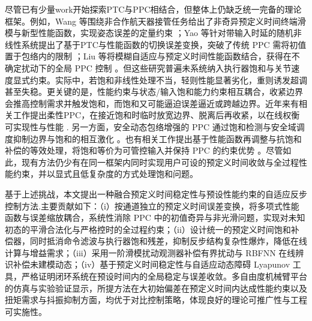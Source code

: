 \documentclass[pdflatex,sn-mathphys-num]{sn-jnl}%
\theoremstyle{thmstyleone}%
\theoremstyle{thmstyletwo}%
\theoremstyle{thmstylethree}%
\begin{document}
尽管已有少量work开始探索PTC与PPC相结合，但整体上仍缺乏统一完备的理论框架。例如，Wang 等围绕非合作航天器接管任务给出了非奇异预定义时间终端滑模与新型性能函数，实现姿态误差的定量约束 \cite{WangEtAl_2023_Predefinedtimeguaranteed}；Yao 等针对带输入时延的随机非线性系统提出了基于PTC与性能函数的切换误差变换，突破了传统 PPC 需将初值置于包络内的限制 \cite{YaoEtAl_2024_Prescribedtimeprescribed}；Liu 等将模糊自适应与预定义时间性能函数结合，获得在不确定扰动下的全局 PPC 控制 \cite{LiuEtAl_2025_Fuzzyadaptive}。但这些研究普遍未系统纳入执行器饱和与关节速度显式约束。实际中，若饱和非线性处理不当，轻则性能显著劣化，重则诱发超调甚至失稳。更关键的是，性能约束与状态/输入饱和能力约束相互耦合，收紧边界会推高控制需求并触发饱和，而饱和又可能逼迫误差逼近或跨越边界。近年来有相关工作提出柔性PPC，在接近饱和时临时放宽边界、脱离后再收紧，以在线权衡可实现性与性能 \cite{Bu_2023_Hypersonic,Yao_2024_Flexible}. 另一方面，安全动态包络增强的 PPC 通过饱和检测与安全域调度抑制边界与饱和的相互激化 \cite{Wang_2025_Enhanced}。也有相关工作提出基于性能函数再调整与抗饱和补偿的等效处理，将饱和等价为可管控输入并保持 PPC 的约束优势 \cite{Wang_2023_Adaptive,ElikerJouffroy_2025_robustquadrotor}。尽管如此，现有方法仍少有在同一框架内同时实现用户可设的预定义时间收敛与全过程性能约束，并以显式且低复杂度的方式处理饱和问题。

基于上述挑战，本文提出一种融合预定义时间稳定性与预设性能约束的自适应反步控制方法.主要贡献如下：（i）按通道独立的预定义时间误差变换，将多项式性能函数与误差缩放耦合，系统性消除 PPC 中的初值奇异与非光滑问题，实现对未知初态的平滑合法化与严格控时的全过程约束；（ii）设计统一的预定义时间饱和补偿器，同时抵消命令滤波与执行器饱和残差，抑制反步结构复杂性爆炸，降低在线计算与增益需求；（iii）采用一阶滑模扰动观测器补偿有界扰动与 RBFNN 在线辨识补偿未建模动态；（iv）基于预定义时间稳定性与自适应动态障碍 Lyapunov 工具，严格证明闭环系统在预设时间内的全局稳定与误差收敛。多自由度机械臂平台的仿真与实验验证显示，所提方法在大初始偏差在预定义时间内达成性能约束以及扭矩需求与抖振抑制方面，均优于对比控制策略，体现良好的理论可推广性与工程可实施性。

\end{document}
